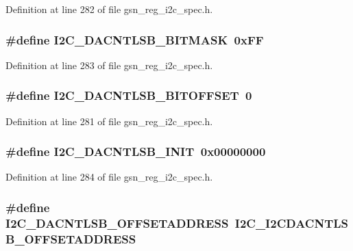 Definition at line 282 of file gsn\_\-reg\_\-i2c\_\-spec.h.

\hypertarget{a00558_ac62a5e25cf8f2c123d2544e679b0aa93}{
\subsubsection[{I2C\_\-DACNTLSB\_\-BITMASK}]{\setlength{\rightskip}{0pt plus 5cm}\#define I2C\_\-DACNTLSB\_\-BITMASK~0xFF}}
\label{a00558_ac62a5e25cf8f2c123d2544e679b0aa93}


Definition at line 283 of file gsn\_\-reg\_\-i2c\_\-spec.h.

\hypertarget{a00558_a0f0e4555e0da2f09ab5696bef3bd4dac}{
\subsubsection[{I2C\_\-DACNTLSB\_\-BITOFFSET}]{\setlength{\rightskip}{0pt plus 5cm}\#define I2C\_\-DACNTLSB\_\-BITOFFSET~0}}
\label{a00558_a0f0e4555e0da2f09ab5696bef3bd4dac}


Definition at line 281 of file gsn\_\-reg\_\-i2c\_\-spec.h.

\hypertarget{a00558_afaea3c3b604960847f3d3da0dd2708e6}{
\subsubsection[{I2C\_\-DACNTLSB\_\-INIT}]{\setlength{\rightskip}{0pt plus 5cm}\#define I2C\_\-DACNTLSB\_\-INIT~0x00000000}}
\label{a00558_afaea3c3b604960847f3d3da0dd2708e6}


Definition at line 284 of file gsn\_\-reg\_\-i2c\_\-spec.h.

\hypertarget{a00558_ae600b2a76b934955c324f82b35fa805b}{
\subsubsection[{I2C\_\-DACNTLSB\_\-OFFSETADDRESS}]{\setlength{\rightskip}{0pt plus 5cm}\#define I2C\_\-DACNTLSB\_\-OFFSETADDRESS~I2C\_\-I2CDACNTLSB\_\-OFFSETADDRESS}}
\label{a00558_ae600b2a76b934955c324f82b35fa805b}



